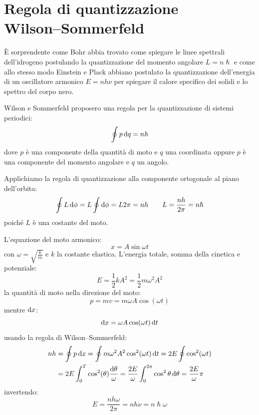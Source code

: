 \section[Regola di quantizzazione Wilson--Sommerfeld]{Regola di quantizzazione\\ Wil\-son--Som\-mer\-feld}
\`E sorprendente come Bohr abbia trovato come spiegare le linee spettrali dell'idrogeno postulando la quantizzazione del momento angolare $L=n\hslash$ e come allo stesso modo Einstein e Plack abbiano postulato la quantizzazione dell'energia di un oscillatore armonico $E=nh\nu$ per spiegare il calore specifico dei solidi e lo spettro del corpo nero.

Wilson e Sommerfeld proposero una regola per la quantizzazione di sistemi periodici:
\begin{equation}
	\oint p\,\mathrm{d} q=nh
\end{equation}
dove $p$ è una componente della quantità di moto e $q$ una coordinata oppure $p$ è una componente del momento angolare e $q$ un angolo.
\begin{Es}
	Applichiamo la regola di quantizzazione alla componente ortogonale al piano dell'orbita:
	\[
		\oint L\,\mathrm{d} \phi=L\oint\mathrm{d}\phi=L 2\pi=nh\qquad L=\frac{nh}{2\pi}=n\hslash
	\]
	poiché $L$ è una costante del moto.
\end{Es}
\begin{Es}
	L'equazione del moto armonico:
	\[
		x=A\sin\omega t
	\]
	con $\omega=\sqrt{\frac{k}{m}}$ e $k$ la costante elastica. L'energia totale, somma della cinetica e potenziale:
	\[
		E=\frac{1}{2}kA^2=\frac{1}{2}m\omega^2A^2
	\]
	la quantità di moto nella direzione del moto:
	\[
		p=mv=m\omega A\cos(\omega t)
	\]
	mentre $\mathrm{d} x$:
	\[
		\mathrm{d} x=\omega A\cos(\omega t)\,\mathrm{d} t
	\]
	usando la regola di Wilson--Sommerfeld:
	\[
		\begin{split}
			nh&=\oint p\,\mathrm{d} x=\oint m\omega^2A^2\cos^2(\omega t)\,\mathrm{d} t=2E\oint\cos^2(\omega t)\\
			&=2E\int_0^T\cos^2(\theta)\frac{\mathrm{d} \theta}{\omega}=\frac{2E}{\omega}\int_0^{2\pi}\cos^2\theta\,\mathrm{d}\theta=\frac{2E}{\omega}\pi
		\end{split}
	\]
	invertendo:
	\[
		E=\frac{nh\omega}{2\pi}=nh\nu=n\hslash\omega
	\]
\end{Es}


